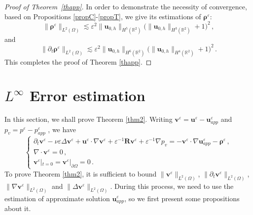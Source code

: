 \documentclass[pdflatex,sn-mathphys-num]{sn-jnl}%
\theoremstyle{thmstyleone}%
\theoremstyle{thmstyletwo}%
\theoremstyle{thmstylethree}%
\theoremstyle{thmstyletwo}
\begin{document}
\begin{proof}[Proof of Theorem~{\upshape\ref{thapp}}]
In order to demonstrate the necessity of convergence, based on Propositions \ref{propC}-\ref{propT}, we give its estimations of $\boldsymbol{\rho}^\varepsilon$:
\begin{equation}\label{pho}
	\lVert
	\boldsymbol \rho^{\varepsilon}\rVert_{{L}^{2}(\Omega)}
	\lesssim
	 \varepsilon^2
	\lVert
	{\boldsymbol{u}}_{0,h}
	\rVert_{{H}^{5}(\mathbb{R}^2)}
	\big(
	\lVert
	{\boldsymbol{u}}_{0,h}
	\rVert_{{H}^{3}(\mathbb{R}^2)}
	+1\big)^2
	\,,
\end{equation}	
and
\begin{equation}\label{phot}
	\lVert
	\partial_t\boldsymbol \rho^{\varepsilon}\rVert_{{L}^{2}(\Omega)}
	\lesssim
	 \varepsilon^2
	\lVert
	{\boldsymbol{u}}_{0,h}
	\rVert_{{H}^{6}(\mathbb{R}^2)}
	\big(
	\lVert
	{\boldsymbol{u}}_{0,h}
	\rVert_{{H}^{4}(\mathbb{R}^2)}
	+1
	\big)^2
	\,.
\end{equation}	
	This completes the proof of Theorem \ref{thapp}.
\end{proof}












\section{$L^\infty$ Error estimation}\label{sec4}



In this section, 
we shall prove Theorem \ref{thm2}.
Writing $\boldsymbol{v}^\varepsilon=\boldsymbol{u}^\varepsilon-\boldsymbol{u}_{app}^\varepsilon$ and $p_v=p^\varepsilon-p_{app}^\varepsilon$ , we have
\begin{equation}\label{2.65}
	\begin{cases}
		\partial_{t} {\boldsymbol v}^{\varepsilon}-\nu\varepsilon\Delta{\boldsymbol v}^{\varepsilon}
		+{\boldsymbol u}^{\varepsilon} \cdot \nabla {\boldsymbol v}^{\varepsilon}
		+{\varepsilon}^{-1}\boldsymbol{R}\boldsymbol v^{\varepsilon}
		+{\varepsilon}^{-1}\nabla p_v 
		=-{\boldsymbol v}^{\varepsilon} \cdot \nabla\boldsymbol{u}^\varepsilon_{app}
		-\boldsymbol \rho^{\varepsilon}\,,\\
		\nabla\cdot {\boldsymbol v}^{\varepsilon}=0\,,\\
		{\boldsymbol v}^{\varepsilon}|_{t=0}={\boldsymbol v}^{\varepsilon}|_{\partial\Omega}=0\,.
	\end{cases}
\end{equation}
To prove  Theorem \ref{thm2}, it is sufficient to bound $\lVert \boldsymbol{v}^\varepsilon \rVert_{{L}^{2}(\Omega)}$, $\lVert \partial_t \boldsymbol{v}^\varepsilon \rVert_{{L}^{2}(\Omega)}$,  $\lVert \nabla\boldsymbol{v}^\varepsilon \rVert_{{L}^{2}(\Omega)}$ and $\lVert \Delta\boldsymbol{v}^\varepsilon \rVert_{{L}^{2}(\Omega)}$.
During this process,  we need to use the estimation of approximate solution $\boldsymbol{u}_{app}^\varepsilon$, so we first present some propositions about it.
\end{document}
